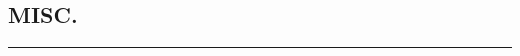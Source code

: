 \documentclass[10pt,a4]{article}
\begin{document}
\begin{small}
\begin{itemize}{}{}
\end{itemize}

\vspace{0.1cm}


%
%
%
%
%
%
%
%


%

\vspace{0.1cm}


\subsection*{MISC.}
\hrule
\vspace{0.2cm}


\end{small}
\end{document}
